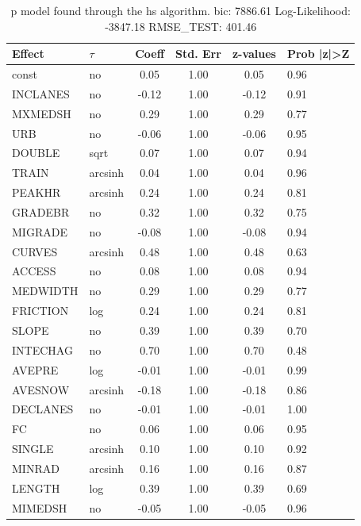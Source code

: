 \begin{table}
	\caption{p model found through the hs algorithm. bic: 7886.61 Log-Likelihood: -3847.18 RMSE_TEST: 401.46}
	\begin{center}
		\begin{tabular}{|l|l|c|c|c|l|}
			\hline
			Effect & $\tau$ & Coeff & Std. Err & z-values & Prob |z|>Z \\
			\hline
			const & no & 0.05 & 1.00 & 0.05 & 0.96 \\
			\hline
			INCLANES & no & -0.12 & 1.00 & -0.12 & 0.91 \\
			\hline
			MXMEDSH & no & 0.29 & 1.00 & 0.29 & 0.77 \\
			\hline
			URB & no & -0.06 & 1.00 & -0.06 & 0.95 \\
			\hline
			DOUBLE & sqrt & 0.07 & 1.00 & 0.07 & 0.94 \\
			\hline
			TRAIN & arcsinh & 0.04 & 1.00 & 0.04 & 0.96 \\
			\hline
			PEAKHR & arcsinh & 0.24 & 1.00 & 0.24 & 0.81 \\
			\hline
			GRADEBR & no & 0.32 & 1.00 & 0.32 & 0.75 \\
			\hline
			MIGRADE & no & -0.08 & 1.00 & -0.08 & 0.94 \\
			\hline
			CURVES & arcsinh & 0.48 & 1.00 & 0.48 & 0.63 \\
			\hline
			ACCESS & no & 0.08 & 1.00 & 0.08 & 0.94 \\
			\hline
			MEDWIDTH & no & 0.29 & 1.00 & 0.29 & 0.77 \\
			\hline
			FRICTION & log & 0.24 & 1.00 & 0.24 & 0.81 \\
			\hline
			SLOPE & no & 0.39 & 1.00 & 0.39 & 0.70 \\
			\hline
			INTECHAG & no & 0.70 & 1.00 & 0.70 & 0.48 \\
			\hline
			AVEPRE & log & -0.01 & 1.00 & -0.01 & 0.99 \\
			\hline
			AVESNOW & arcsinh & -0.18 & 1.00 & -0.18 & 0.86 \\
			\hline
			DECLANES & no & -0.01 & 1.00 & -0.01 & 1.00 \\
			\hline
			FC & no & 0.06 & 1.00 & 0.06 & 0.95 \\
			\hline
			SINGLE & arcsinh & 0.10 & 1.00 & 0.10 & 0.92 \\
			\hline
			MINRAD & arcsinh & 0.16 & 1.00 & 0.16 & 0.87 \\
			\hline
			LENGTH & log & 0.39 & 1.00 & 0.39 & 0.69 \\
			\hline
			MIMEDSH & no & -0.05 & 1.00 & -0.05 & 0.96 \\

\end{tabular}
\end{center}
\end{table}
